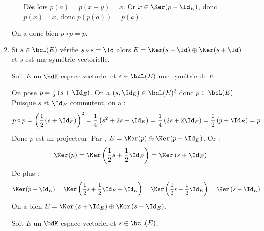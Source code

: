 \documentclass[a4paper,french,bookmarks]{article}
\begin{document}
\begin{enumerate}
\begin{nproof}
\begin{enumerate}
             Dès lors $p(a) = p(x + y) = x$. Or $x \in \Ker(p - \Id_E)$,
             donc $p(x) = x$, donc $p(p(a)) = p(a)$.
         \end{enumerate}
         
         On a donc bien $p \circ p = p$.
    \end{nproof}
    \yesbefore
    
    \item Si $s \in \bcL(E)$ vérifie $s \circ s = \Id$ alors $E = \Ker(s
    - \Id) \oplus \Ker (s + \Id)$ et $s$ est une symétrie vectorielle.
    
    \noafter
    \nobefore
    \begin{nproof}
        Soit $E$ un $\bdK$-espace vectoriel et $s \in \bcL(E)$ une
        symétrie de $E$.
            
        On pose $p = \frac{1}{2}\left(s + \Id_E\right)$. On a $(s,
        \Id_E) \in \bcL(E)^2$ donc $p \in \bcL(E)$. Puisque $s$ et
        $\Id_E$ commutent, on a :
        \[ p \circ p = \left(\dfrac{1}{2}\left(s + \Id_E\right)\right)^2
        = \dfrac{1}{4}\left(s^2 + 2s + \Id_E\right) =
        \dfrac{1}{4}\left(2s + 2\Id_E\right) = \dfrac{1}{2}\left(p +
        \Id_E\right) = p\]
        Donc $p$ est un projecteur. Par , $E = \Ker(p) \oplus
        \Ker(p - \Id_E)$. Or :
        \[ \Ker(p) = \Ker\left(\frac{1}{2}s + \frac{1}{2}\Id_E\right) =
        \Ker\left(s + \Id_E\right)
        \]
        De plus :
        \[ \Ker(p - \Id_E) = \Ker\left(\frac{1}{2}s + \frac{1}{2}\Id_E -
        \Id_E\right) = \Ker\left(\frac{1}{2}s - \frac{1}{2}\Id_E\right)
        = \Ker\left(s - \Id_E\right) \]
        On a bien $E = \Ker\left(s + \Id_E\right) \oplus \Ker\left(s -
        \Id_E\right)$.
    \end{nproof}
    \yesafter
    \begin{nproof}
         Soit $E$ un $\bdK$-espace vectoriel et $s \in \bcL(E)$. 
         

\end{nproof}
\end{enumerate}
\end{document}
